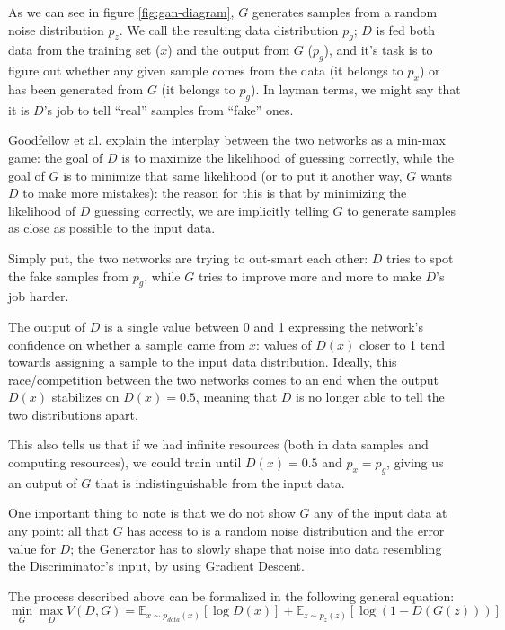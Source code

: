 As we can see in figure \ref{fig:gan-diagram}, $G$ generates samples from a random noise distribution $p_z$. We call the resulting data distribution $p_g$; $D$ is fed both data from the training set ($x$) and the output from $G$ ($p_g$), and it's task is to figure out whether any given sample comes from the data (it belongs to $p_x$) or has been generated from $G$ (it belongs to $p_g$). In layman terms, we might say that it is $D$'s job to tell \enquote{real} samples from \enquote{fake} ones.

Goodfellow et al.\cite{Goodfellow2014} explain the interplay between the two networks as a min-max game: the goal of $D$ is to maximize the likelihood of guessing correctly, while the goal of $G$ is to minimize that same likelihood (or to put it another way, $G$ wants $D$ to make more mistakes): the reason for this is that by minimizing the likelihood of $D$ guessing correctly, we are implicitly telling $G$ to generate samples as close as possible to the input data.

Simply put, the two networks are trying to out-smart each other: $D$ tries to spot the fake samples from $p_g$, while $G$ tries to improve more and more to make $D$'s job harder.

The output of $D$ is a single value between 0 and 1 expressing the network's confidence on whether a sample came from $x$: values of $D(x)$ closer to 1 tend towards assigning a sample to the input data distribution.
Ideally, this race/competition between the two networks comes to an end when the output $D(x)$ stabilizes on $D(x)=0.5$, meaning that $D$ is no longer able to tell the two distributions apart.

This also tells us that if we had infinite resources (both in  data samples and computing resources), we could train until $D(x)=0.5$ and $p_x=p_g$, giving us an output of $G$ that is indistinguishable from the input data.

One important thing to note is that we do not show $G$ any of the input data at any point: all that $G$ has access to is a random noise distribution and the error value for $D$; the Generator has to slowly shape that noise into data resembling the Discriminator's input, by using Gradient Descent.  

The process described above can be formalized in the following general equation:
\begin{equation}
 \min\limits_{G} \max\limits_{D} V(D,G)=\mathbb{E}_{x\sim p_{data}(x)}[\log{D(x)}]+\mathbb{E}_{z\sim p_z(z)}[\log{(1-D(G(z)))}] 
\end{equation} 

